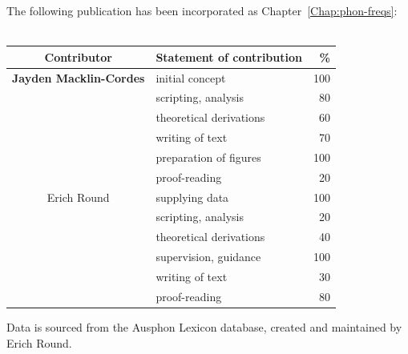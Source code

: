 \cleartoevenpage
\pagestyle{empty}	

\noindent
The following publication has been incorporated as Chapter~\ref{Chap:phon-freqs}:\\

\noindent
{}\\

\begin{table}[h]
	\centering
	\begin{tabular}{clr}
		\toprule
		Contributor & Statement of contribution & \% \\
		\midrule
		\textbf{Jayden Macklin-Cordes}	& initial concept			& 100 \\
		                                & scripting, analysis     	& 80  \\
		                                & theoretical derivations 	& 60  \\
		                                & writing of text 			& 70  \\
		                                & preparation of figures 	& 100 \\
										& proof-reading				& 20  \\
		\midrule
		Erich Round						& supplying data            & 100 \\
		                                & scripting, analysis       & 20  \\
		                                & theoretical derivations 	& 40  \\
		                                & supervision, guidance 	& 100 \\
		                                & writing of text 			& 30  \\
										& proof-reading				& 80  \\
		\bottomrule
	\end{tabular}
\end{table}

\noindent
Data is sourced from the Ausphon Lexicon database, created and maintained by Erich Round.\\


